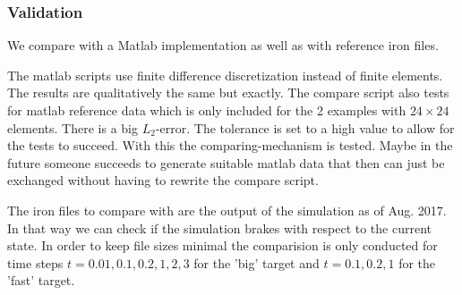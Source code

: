 %
\subsubsection{Validation}
%
We compare with a Matlab implementation as well as with reference iron files.

The matlab scripts use finite difference discretization instead of finite elements.
The results are qualitatively the same but exactly. The compare script also tests for matlab reference data which is only included for the 2 examples with $24\times 24$ elements. There is a big $L_2$-error. The tolerance is set to a high value to allow for the tests to succeed. With this the comparing-mechanism is tested. Maybe in the future someone succeeds to generate suitable matlab data that then can just be exchanged without having to rewrite the compare script.

The iron files to compare with are the output of the simulation as of Aug. 2017. In that way we can check if the simulation brakes with respect to the current state.
In order to keep file sizes minimal the comparision is only conducted for time steps ${t=0.01, 0.1, 0.2, 1, 2, 3}$ for the 'big' target and ${t=0.1, 0.2, 1}$ for the 'fast' target.
%

